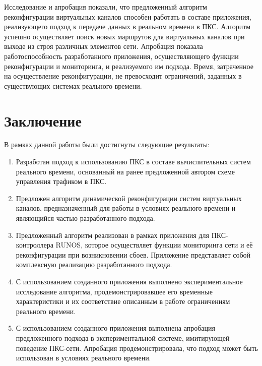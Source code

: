 \documentclass[12pt, a4paper]{article}
\begin{document}
Исследование и апробация показали, что предложенный алгоритм реконфигурации виртуальных каналов способен работать в составе приложения, реализующего подход к передаче данных в реальном времени в ПКС. Алгоритм успешно осуществляет поиск новых маршрутов для виртуальных каналов при выходе из строя различных элементов сети. Апробация показала работоспособность разработанного приложения, осуществляющего функции реконфигурации и мониторинга, и реализуемого им подхода. Время, затраченное на осуществление реконфигурации, не превосходит ограничений, заданных в существующих системах реального времени.

\section*{Заключение}

В рамках данной работы были достигнуты следующие результаты:
\begin{enumerate}
	\item Разработан подход к использованию ПКС в составе вычислительных систем реального времени, основанный на ранее предложенной автором схеме управления трафиком в ПКС.
	\item Предложен алгоритм динамической реконфигурации систем виртуальных каналов, предназначенный для работы в условиях реального времени и являющийся частью разработанного подхода.
	\item Предложенный алгоритм реализован в рамках приложения для ПКС-контроллера RUNOS, которое осуществляет функции мониторинга сети и её реконфигурации при возникновении сбоев. Приложение представляет собой комплексную реализацию разработанного подхода.
	\item С использованием созданного приложения выполнено экспериментальное исследование алгоритма, продемонстрировавшее его временные характеристики и их соответствие описанным в работе ограничениям реального времени.
	\item С использованием созданного приложения выполнена апробация предложенного подхода в экспериментальной системе, имитирующей поведение ПКС-сети. Апробация продемонстрировала, что подход может быть использован в условиях реального времени.
\end{enumerate}
\end{document}
